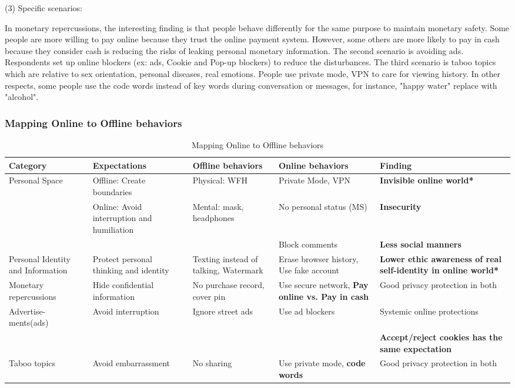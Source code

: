 (3) Specific scenarios:

In monetary repercussions, the interesting finding is that people behave differently for the same purpose to maintain monetary safety. Some people are more willing to pay online because they trust the online payment system. However, some others are more likely to pay in cash because they consider cash is reducing the risks of leaking personal monetary information. The second scenario is avoiding ads. Respondents set up online blockers (ex: ads, Cookie and Pop-up blockers) to reduce the disturbances. The third scenario is taboo topics which are relative to sex orientation, personal diseases, real emotions. People use private mode, VPN to care for viewing history. In other respects, some people use the code words instead of key words during conversation or messages, for instance, "happy water" replace with "alcohol". 


\subsubsection{Mapping Online to Offline behaviors}

\begin{table}[H]
    \centering
    \begin{tabular}{ |p{2cm}|p{2.8cm}|p{3.2cm}|p{3.5cm}|p{3cm}|  }
\hline
    Category & Expectations & Offline behaviors & Online behaviors & Finding \\
\hline
\hline
     Personal Space & Offline: Create boundaries & Physical: WFH & Private Mode, VPN & \textbf{Invisible online world*} \\ \cline{2-5}
     & Online: Avoid interruption and humiliation & Mental: mask, headphones & No personal status (MS) & \textbf{Insecurity} \\\cline{4-5}
     & & & Block comments & \textbf{Less social manners} \\
\hline
     Personal Identity and Information & Protect personal thinking and identity & Texting instead of talking, Watermark & Erase browser history, Use fake account & \textbf{Lower ethic awareness of real self-identity in online world*}\\
\hline
    Monetary repercussions & Hide confidential information & No purchase record, cover pin & Use secure network, \textbf{Pay online vs. Pay in cash} & Good privacy protection in both\\
\hline
    Advertise- ments(ads) & Avoid interruption & Ignore street ads & Use ad blockers & Systemic online protections \\ \cline{5-5}
    & & & & \textbf{Accept/reject cookies has the same expectation}\\
\hline
    Taboo topics & Avoid embarrassment & No sharing & Use private mode, \textbf{code words} & Good privacy protection in both\\
\hline
    \end{tabular}
    \caption{Mapping Online to Offline behaviors}
    \label{tab:meng_t1}
\end{table}

